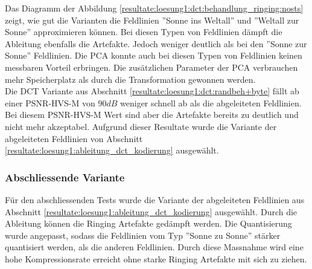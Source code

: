 Das Diagramm der Abbildung  \ref{resultate:loesung1:dct:behandlung_ringing:nosts} zeigt, wie gut die Varianten die Feldlinien ''Sonne ins Weltall'' und ''Weltall zur Sonne'' approximieren können. Bei diesen Typen von Feldlinien dämpft die Ableitung ebenfalls die Artefakte. Jedoch weniger deutlich als bei den ''Sonne zur Sonne'' Feldlinien. Die PCA konnte auch bei diesen Typen von Feldlinien keinen messbaren Vorteil erbringen. Die zusätzlichen Parameter der PCA verbrauchen mehr Speicherplatz als durch die Transformation gewonnen werden.\\
Die DCT Variante aus Abschnitt \ref{resultate:loesung1:dct:randbeh+byte} fällt ab einer PSNR-HVS-M von $90 dB$ weniger schnell ab als die abgeleiteten Feldlinien. Bei diesem PSNR-HVS-M Wert sind aber die Artefakte bereits zu deutlich und nicht mehr akzeptabel. Aufgrund dieser Resultate wurde die Variante der abgeleiteten Feldlinien von Abschnitt \ref{resultate:loesung1:ableitung_dct_kodierung} ausgewählt. 

\subsubsection{Abschliessende Variante}
Für den abschliessenden Tests wurde die Variante der abgeleiteten Feldlinien aus Abschnitt \ref{resultate:loesung1:ableitung_dct_kodierung} ausgewählt. Durch die Ableitung können die Ringing Artefakte gedämpft werden. Die Quantisierung wurde angepasst, sodass die Feldlinien vom Typ ''Sonne zu Sonne'' stärker quantisiert werden, als die anderen Feldlinien. Durch diese Massnahme wird eine hohe Kompressionsrate erreicht ohne starke Ringing Artefakte mit sich zu ziehen.

